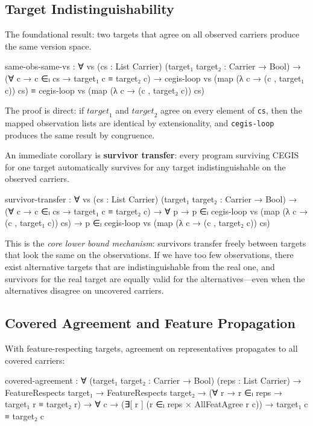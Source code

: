 \documentclass[9pt,a4paper]{article}
\theoremstyle{plain}
\theoremstyle{definition}
\theoremstyle{remark}
\begin{document}
\subsection{Target Indistinguishability}
\label{sec:indistinguishable}

The foundational result: two targets that agree on all observed carriers produce the same version space.

\begin{spec}
    same-obs-same-vs : ∀ vs (cs : List Carrier)
      (target₁ target₂ : Carrier → Bool) →
      (∀ c → c ∈ₗ cs → target₁ c ≡ target₂ c) →
      cegis-loop vs (map (λ c → (c , target₁ c)) cs)
        ≡ cegis-loop vs (map (λ c → (c , target₂ c)) cs)
\end{spec}

\noindent The proof is direct: if $\mathit{target}_1$ and $\mathit{target}_2$ agree on every element of \texttt{cs}, then the mapped observation lists are identical by extensionality, and \texttt{cegis-loop} produces the same result by congruence.

An immediate corollary is \textbf{survivor transfer}: every program surviving CEGIS for one target automatically survives for any target indistinguishable on the observed carriers.

\begin{spec}
    survivor-transfer : ∀ vs (cs : List Carrier)
      (target₁ target₂ : Carrier → Bool) →
      (∀ c → c ∈ₗ cs → target₁ c ≡ target₂ c) →
      ∀ p → p ∈ₗ cegis-loop vs (map (λ c → (c , target₁ c)) cs) →
            p ∈ₗ cegis-loop vs (map (λ c → (c , target₂ c)) cs)
\end{spec}

\noindent This is the \emph{core lower bound mechanism}: survivors transfer freely between targets that look the same on the observations.
If we have too few observations, there exist alternative targets that are indistinguishable from the real one, and survivors for the real target are equally valid for the alternatives---even when the alternatives disagree on uncovered carriers.

\subsection{Covered Agreement and Feature Propagation}
\label{sec:covered-agree}

With feature-respecting targets, agreement on representatives propagates to all covered carriers:

\begin{spec}
    covered-agreement : ∀ (target₁ target₂ : Carrier → Bool)
      (reps : List Carrier) →
      FeatureRespects target₁ →
      FeatureRespects target₂ →
      (∀ r → r ∈ₗ reps → target₁ r ≡ target₂ r) →
      ∀ c → (∃[ r ] (r ∈ₗ reps × AllFeatAgree r c)) →
      target₁ c ≡ target₂ c
\end{spec}
\end{document}
